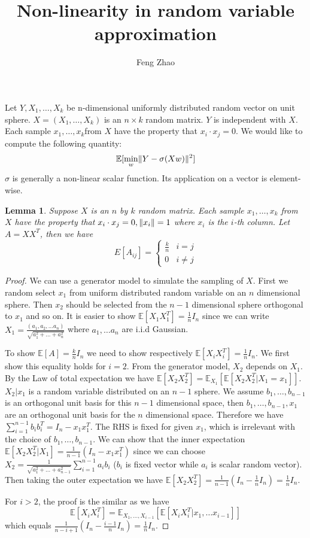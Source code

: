 \documentclass{article}
\title{Non-linearity in random variable approximation}
\author{Feng Zhao}
\DeclarePairedDelimiter\norm{\lVert}{\rVert}
\def\E{\mathbb{E}}
\newtheorem{lemma}{Lemma}
\begin{document}
\maketitle
Let $Y, X_1, \dots, X_k$ be n-dimensional uniformly distributed random vector on unit sphere. $X=(X_1, \dots, X_k)$ is an $n\times k$ random matrix. $Y$ is independent with $X$. Each sample $x_1, \dots, x_k$from $X$ have the property that $x_i \cdot x_j = 0$. We would like to compute the following quantity:
\begin{equation}\label{eq:Eminw}
\E[\min_w \norm{Y - \sigma (X w ) }^2]
\end{equation}
$\sigma$ is generally a non-linear scalar function. Its application on a vector is element-wise.
\begin{lemma}\label{lem:uniform}
Suppose $X$ is an $n$ by $k$ random matrix. Each sample $x_1, \dots, x_k$ from $X$ have the property that $x_i \cdot x_j = 0, \norm{x_i}=1$ where $x_i$ is the $i$-th column.  Let $A=X X^T$, then we have
\begin{equation}
E[A_{ij}]= \begin{cases}
\frac{k}{n} & i = j\\
0 & i\neq j 
\end{cases}
\end{equation}
\end{lemma}
\begin{proof}
We can use a generator model to simulate the sampling of $X$. First we random select $x_1$ from uniform distributed random variable on an $n$ dimensional sphere. Then $x_2$ should be selected from the $n-1$ dimensional sphere orthogonal to $x_1$ and so on.
It is easier to show $\E[X_1X_1^T] = \frac{1}{n} I_n$ since we can write $X_1 = \frac{(a_1, a_2, \dots a_n) }{\sqrt{a_1^2+\dots + a_n^2}}$ where $a_1, \dots a_n$ are i.i.d Gaussian.

To show $\E[A]=\frac{k}{n}I_n$ we need to show respectively $\E[X_iX_i^T]=\frac{1}{n} I_n$. We first show this equality holds for $i=2$. From the generator model, $X_2$ depends on $X_1$. By the Law of total expectation we have $\E[X_2 X_2^T] = \E_{X_1}[\E[X_2 X_2^T |X_1 = x_1]]$. $X_2 | x_1$ is a random variable distributed on an $n-1$ sphere. We assume $b_1, \dots, b_{n-1}$ is an orthogonal unit basis for this $n-1$ dimensional space,
then $b_1, \dots, b_{n-1}, x_1$ are an orthogonal unit basis for the $n$ dimensional space. Therefore we have
$\sum_{i=1}^{n-1} b_i b_i^T = I_n -  x_1 x_1^T $. The RHS is fixed for given $x_1$, which is irrelevant with the choice of $b_1, \dots, b_{n-1}$. We can show that the inner expectation $\E[X_2 X_2^T |X_1] = \frac{1}{n-1}(I_n - x_1 x_1^T)$ since we can choose $X_2 = \frac{1}{\sqrt{a_1^2 + \dots + a_{n-1}^2}} \sum_{i=1}^{n-1} a_i b_i$ ($b_i$ is fixed vector while $a_i$ is scalar random vector). Then taking the outer expectation we have $\E[X_2 X_2^T] = \frac{1}{n-1} (I_n - \frac{1}{n} I_n) = \frac{1}{n} I_n$.

For $i>2$, the proof is the similar as we have $$
\E[X_i X_i^T] = \E_{X_1, \dots, X_{i-1}} [\E[X_i X_i^T | x_1, \dots x_{i-1}]]
$$
 which equals $\frac{1}{n-i+1}(I_n - \frac{i-1}{n} I_n) = \frac{1}{n} I_n$.
\end{proof}
\end{document}
